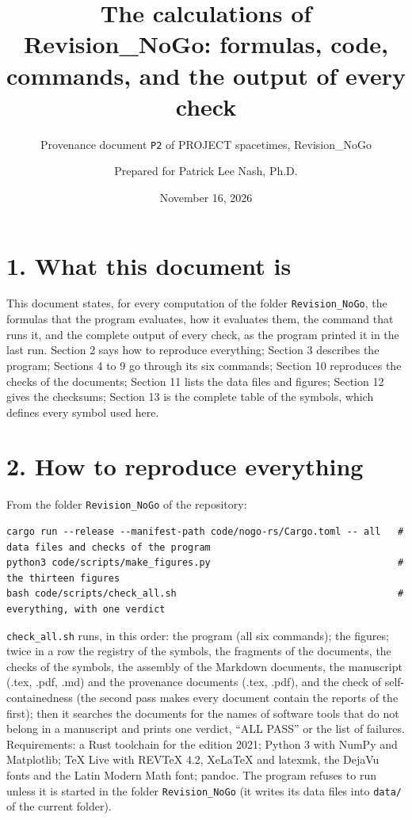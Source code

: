 \documentclass[
  10pt,
]{article}
\title{The calculations of Revision\_NoGo: formulas, code, commands, and
the output of every check}
\subtitle{Provenance document \texttt{P2} of PROJECT spacetimes,
Revision\_NoGo}
\author{Prepared for Patrick Lee Nash, Ph.D.}
\date{November 16, 2026}
\begin{document}
\maketitle

\hypertarget{what-this-document-is}{%
\section{1. What this document is}\label{what-this-document-is}}

This document states, for every computation of the folder
\texttt{Revision\_NoGo}, the formulas that the program evaluates, how it
evaluates them, the command that runs it, and the complete output of
every check, as the program printed it in the last run. Section 2 says
how to reproduce everything; Section 3 describes the program; Sections 4
to 9 go through its six commands; Section 10 reproduces the checks of
the documents; Section 11 lists the data files and figures; Section 12
gives the checksums; Section 13 is the complete table of the symbols,
which defines every symbol used here.

\hypertarget{how-to-reproduce-everything}{%
\section{2. How to reproduce
everything}\label{how-to-reproduce-everything}}

From the folder \texttt{Revision\_NoGo} of the repository:

\begin{verbatim}
cargo run --release --manifest-path code/nogo-rs/Cargo.toml -- all   # data files and checks of the program
python3 code/scripts/make_figures.py                                 # the thirteen figures
bash code/scripts/check_all.sh                                       # everything, with one verdict
\end{verbatim}

\texttt{check\_all.sh} runs, in this order: the program (all six
commands); the figures; twice in a row the registry of the symbols, the
fragments of the documents, the checks of the symbols, the assembly of
the Markdown documents, the manuscript (.tex, .pdf, .md) and the
provenance documents (.tex, .pdf), and the check of self-containedness
(the second pass makes every document contain the reports of the first);
then it searches the documents for the names of software tools that do
not belong in a manuscript and prints one verdict, ``ALL PASS'' or the
list of failures. Requirements: a Rust toolchain for the edition 2021;
Python 3 with NumPy and Matplotlib; TeX Live with REVTeX 4.2, XeLaTeX
and latexmk, the DejaVu fonts and the Latin Modern Math font; pandoc.
The program refuses to run unless it is started in the folder
\texttt{Revision\_NoGo} (it writes its data files into \texttt{data/} of
the current folder).
\end{document}
